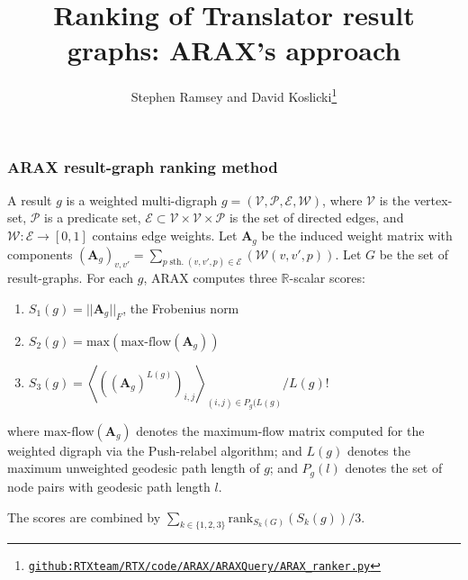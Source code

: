 \documentclass{beamer}
\title{Ranking of Translator result graphs: ARAX's approach}
\author{Stephen Ramsey and David Koslicki\thanks{\href{https://github.com/RTXteam/RTX/blob/master/code/ARAX/ARAXQuery/ARAX_ranker.py}{
  \small{\texttt{github:RTXteam/RTX/code/ARAX/ARAXQuery/ARAX\_ranker.py}}}}}
\institute{Team Expander Agent}
\begin{document}
\frame{\titlepage}
\begin{frame}
  \frametitle{ARAX result-graph ranking method} A result $g$ is a weighted
  multi-digraph $g = ({\mathcal V}, {\mathcal P}, {\mathcal E}, {\mathcal W})$,
  where ${\mathcal V}$ is the vertex-set, ${\mathcal P}$ is a predicate set,
  ${\mathcal E} \subset {\mathcal V} \times {\mathcal V} \times {\mathcal P}$ is
  the set of directed edges, and ${\mathcal W}: {\mathcal E} \rightarrow [0,1]$
  contains edge weights. Let $\boldsymbol{A}_g$ be the induced weight matrix
  with components $(\boldsymbol{A}_g)_{v,v'} = \sum_{p \; \textrm{sth.} \;
    (v,v',p) \in {\mathcal E}}({\mathcal W}(v,v',p))$.  Let $G$ be the set of result-graphs. For each
  $g$, ARAX computes three $\mathbb{R}$-scalar scores:
  \begin{enumerate}
  \item $S_1(g) = ||\boldsymbol{A}_g||_F$, the Frobenius norm
  \item $S_2(g) = \textrm{max}\left( \textrm{max-flow}(\boldsymbol{A}_g) \right)$
  \item $S_3(g) = \left\langle ((\boldsymbol{A}_g)^{L(g)})_{i,j}\right\rangle_{(i,j) \in P_g(L(g)}/L(g)!$
  \end{enumerate}
  where $\textrm{max-flow}(\boldsymbol{A}_g)$ denotes the maximum-flow matrix
  computed for the weighted digraph via the Push-relabel algorithm; and $L(g)$ denotes
  the maximum unweighted geodesic path length of $g$; and
  $P_g(l)$ denotes the set of node pairs with geodesic path length $l$.

  The scores are combined by $\sum_{k \in \{1,2,3\}}\textrm{rank}_{S_k(G)}(S_k(g))/3$.
\end{frame}
\end{document}

